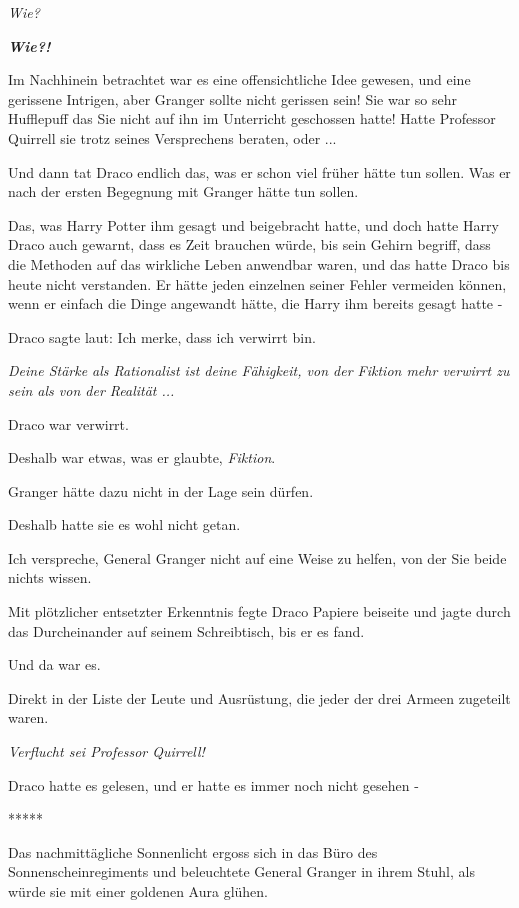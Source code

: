 \emph{Wie?}

\textbf{\emph{Wie?!}}

Im Nachhinein betrachtet war es eine offensichtliche Idee gewesen, und eine
gerissene Intrigen, aber Granger sollte nicht gerissen sein! Sie war so sehr
Hufflepuff das Sie nicht auf ihn im Unterricht geschossen hatte! Hatte Professor
Quirrell sie trotz seines Versprechens beraten, oder ...

Und dann tat Draco endlich das, was er schon viel früher hätte tun sollen. Was
er nach der ersten Begegnung mit Granger hätte tun sollen.

Das, was Harry Potter ihm gesagt und beigebracht hatte, und doch hatte Harry
Draco auch gewarnt, dass es Zeit brauchen würde, bis sein Gehirn begriff, dass
die Methoden auf das wirkliche Leben anwendbar waren, und das hatte Draco bis
heute nicht verstanden. Er hätte jeden einzelnen seiner Fehler vermeiden können,
wenn er einfach die Dinge angewandt hätte, die Harry ihm bereits gesagt hatte -

Draco sagte laut: \glqq{}Ich merke, dass ich verwirrt bin.\grqq{}

\emph{Deine Stärke als Rationalist ist deine Fähigkeit, von der Fiktion mehr
verwirrt zu sein als von der Realität ...}

Draco war verwirrt.

Deshalb war etwas, was er glaubte, \emph{Fiktion}.

Granger hätte dazu nicht in der Lage sein dürfen.

Deshalb hatte sie es wohl nicht getan.

Ich verspreche, General Granger nicht auf eine Weise zu helfen, von der Sie
beide nichts wissen.

Mit plötzlicher entsetzter Erkenntnis fegte Draco Papiere beiseite und jagte
durch das Durcheinander auf seinem Schreibtisch, bis er es fand.

Und da war es.

Direkt in der Liste der Leute und Ausrüstung, die jeder der drei Armeen
zugeteilt waren.

\emph{Verflucht sei Professor Quirrell!}

Draco hatte es gelesen, und er hatte es immer noch nicht gesehen -

\begin{center}*****\end{center}

Das nachmittägliche Sonnenlicht ergoss sich in das Büro des
Sonnenscheinregiments und beleuchtete General Granger in ihrem Stuhl, als würde
sie mit einer goldenen Aura glühen.

